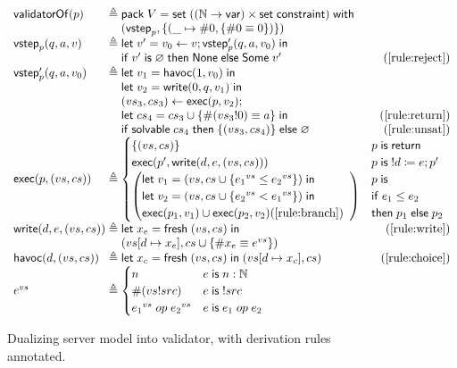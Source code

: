 \begin{figure}[h]
\[\begin{array}{l@{\;}r@{\;}l}
\validatorOf(p)&\triangleq&\existT{V}{\Set((\Nat\to\Var)\times\Set\constraint)}{\\
  &&(\vstep_p,\{(\_\mapsto\#0,\{\#0\equiv0\})\})}\\
\vstep_p(q,a,v)&\triangleq&\letin{v'}{v_0\gets v;\vstep'_p(q,a,v_0)}\\
&&\If v'\Is\varnothing\Then\None\Else\Some v'\hfill(\ref{rule:reject})\\
\vstep'_p(q,a,v_0)&\triangleq&\letin{v_1}{\Havoc(1,v_0)}\\
&&\letin{v_2}{\Write(0,q,v_1)}\\
&&(vs_3,cs_3)\gets\Exec(p,v_2);\\
&&\letin{cs_4}{cs_3\cup\{\#(vs_3!0)\equiv a\}}\hfill(\ref{rule:return})\\
&&\If\solvable cs_4\Then\{(vs_3,cs_4)\}\Else\varnothing\hfill(\ref{rule:unsat})\\
\Exec(p,(vs,cs))&\triangleq&\begin{cases}
  \{(vs,cs)\}&p\Is\Return\\
  \Exec(p',\Write(d,e,(vs,cs)))&p\Is !d\coloneqq e;p'\\
  \left(\begin{array}{@{}l}
    \letin{v_1}{(vs,cs\cup\{{e_1}^{vs}\le{e_2}^{vs}\})}\\
    \letin{v_2}{(vs,cs\cup\{{e_2}^{vs}<{e_1}^{vs}\})}\\
    \Exec(p_1,v_1)\cup\Exec(p_2,v_2)\hfill(\ref{rule:branch})
  \end{array}\right)&\begin{array}{@{}l}p\Is\\
    \If e_1\le e_2\\
    \tthen p_1\Else p_2\end{array}
\end{cases}\\
\Write(d,e,(vs,cs))&\triangleq&\letin{x_e}{\Fresh (vs,cs)}\hfill(\ref{rule:write})\\
&&(\update{vs}{d}{x_e},cs\cup\{\#x_e\equiv e^{vs}\})\\
\Havoc(d,(vs,cs))&\triangleq&\letin{x_c}{\Fresh (vs,cs)}(\update{vs}{d}{x_c},cs)\hfill(\ref{rule:choice})\\
e^{vs}&\triangleq&\begin{cases}
  n&e\Is n:\Nat\\
  \#(vs!src)&e\Is!src\\
  {e_1}^{vs}\oop{e_2}^{vs}&e\Is e_1\oop e_2
\end{cases}
\end{array}\]
\caption[Dualizing server model into validator]{Dualizing server model into
  validator, with derivation rules annotated.}
\label{fig:dualize}
\end{figure}

